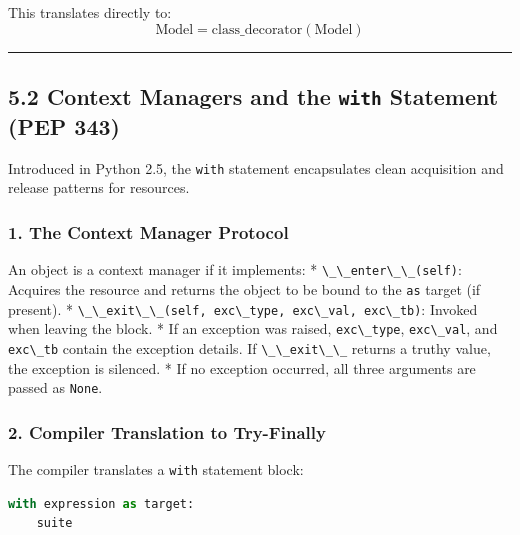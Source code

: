 This translates directly to:
\[\text{Model} = \text{class\_decorator}\left(\text{Model}\right)\]

\begin{center}\rule{0.5\linewidth}{0.5pt}\end{center}

\hypertarget{context-managers-and-the-with-statement-pep-343}{%
\subsection{\texorpdfstring{5.2 Context Managers and the \texttt{with}
Statement (PEP
343)}{5.2 Context Managers and the with Statement (PEP 343)}}\label{context-managers-and-the-with-statement-pep-343}}

Introduced in Python 2.5, the \passthrough{\lstinline!with!} statement
encapsulates clean acquisition and release patterns for resources.

\hypertarget{the-context-manager-protocol}{%
\subsubsection{1. The Context Manager
Protocol}\label{the-context-manager-protocol}}

An object is a context manager if it implements: *
\passthrough{\lstinline!\_\_enter\_\_(self)!}: Acquires the resource and
returns the object to be bound to the \passthrough{\lstinline!as!}
target (if present). *
\passthrough{\lstinline!\_\_exit\_\_(self, exc\_type, exc\_val, exc\_tb)!}:
Invoked when leaving the block. * If an exception was raised,
\passthrough{\lstinline!exc\_type!}, \passthrough{\lstinline!exc\_val!},
and \passthrough{\lstinline!exc\_tb!} contain the exception details. If
\passthrough{\lstinline!\_\_exit\_\_!} returns a truthy value, the
exception is silenced. * If no exception occurred, all three arguments
are passed as \passthrough{\lstinline!None!}.

\hypertarget{compiler-translation-to-try-finally}{%
\subsubsection{2. Compiler Translation to
Try-Finally}\label{compiler-translation-to-try-finally}}

The compiler translates a \passthrough{\lstinline!with!} statement
block:

\begin{lstlisting}[language=Python]
with expression as target:
    suite
\end{lstlisting}

